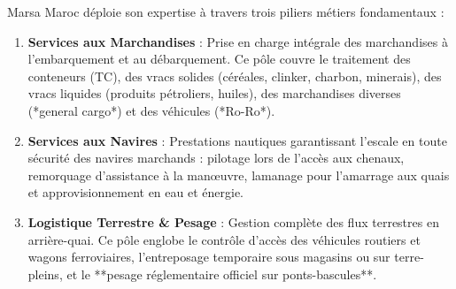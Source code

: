 \documentclass[12pt,a4paper,oneside]{report}
\begin{document}
\begin{table}[H]
\centering
\caption{Fiche technique et identité entreprise de Marsa Maroc}
\label{tab:marsa_fiche_detaillee}
\end{table}

Marsa Maroc déploie son expertise à travers trois piliers métiers fondamentaux :
\begin{enumerate}
    \item \textbf{Services aux Marchandises} : Prise en charge intégrale des marchandises à l'embarquement et au débarquement. Ce pôle couvre le traitement des conteneurs (TC), des vracs solides (céréales, clinker, charbon, minerais), des vracs liquides (produits pétroliers, huiles), des marchandises diverses (*general cargo*) et des véhicules (*Ro-Ro*).
    \item \textbf{Services aux Navires} : Prestations nautiques garantissant l'escale en toute sécurité des navires marchands : pilotage lors de l'accès aux chenaux, remorquage d'assistance à la manœuvre, lamanage pour l'amarrage aux quais et approvisionnement en eau et énergie.
    \item \textbf{Logistique Terrestre \& Pesage} : Gestion complète des flux terrestres en arrière-quai. Ce pôle englobe le contrôle d'accès des véhicules routiers et wagons ferroviaires, l'entreposage temporaire sous magasins ou sur terre-pleins, et le **pesage réglementaire officiel sur ponts-bascules**.
\end{enumerate}
\end{document}
